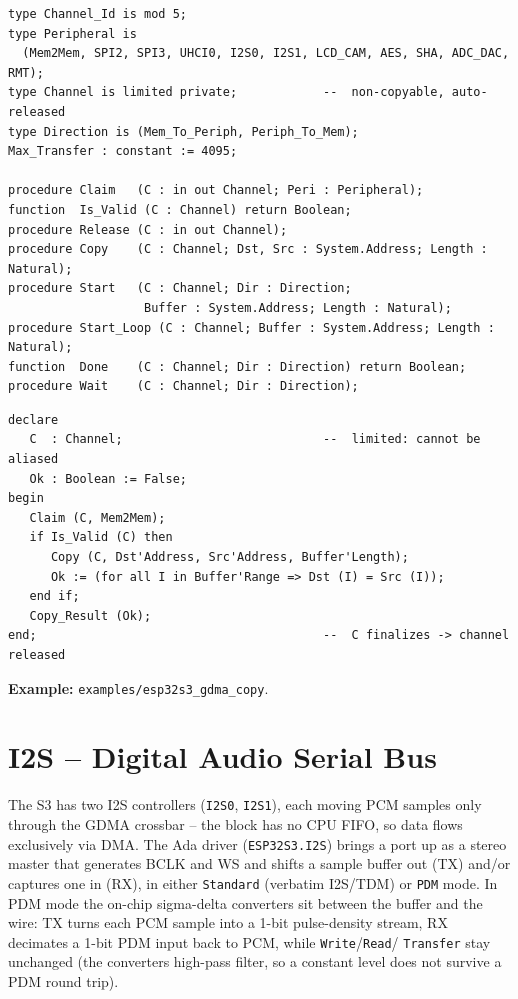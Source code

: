 \begin{lstlisting}
type Channel_Id is mod 5;
type Peripheral is
  (Mem2Mem, SPI2, SPI3, UHCI0, I2S0, I2S1, LCD_CAM, AES, SHA, ADC_DAC, RMT);
type Channel is limited private;            --  non-copyable, auto-released
type Direction is (Mem_To_Periph, Periph_To_Mem);
Max_Transfer : constant := 4095;

procedure Claim   (C : in out Channel; Peri : Peripheral);
function  Is_Valid (C : Channel) return Boolean;
procedure Release (C : in out Channel);
procedure Copy    (C : Channel; Dst, Src : System.Address; Length : Natural);
procedure Start   (C : Channel; Dir : Direction;
                   Buffer : System.Address; Length : Natural);
procedure Start_Loop (C : Channel; Buffer : System.Address; Length : Natural);
function  Done    (C : Channel; Dir : Direction) return Boolean;
procedure Wait    (C : Channel; Dir : Direction);
\end{lstlisting}

\begin{lstlisting}
declare
   C  : Channel;                            --  limited: cannot be aliased
   Ok : Boolean := False;
begin
   Claim (C, Mem2Mem);
   if Is_Valid (C) then
      Copy (C, Dst'Address, Src'Address, Buffer'Length);
      Ok := (for all I in Buffer'Range => Dst (I) = Src (I));
   end if;
   Copy_Result (Ok);
end;                                        --  C finalizes -> channel released
\end{lstlisting}


\noindent\textbf{Example:} \texttt{examples/esp32s3\_gdma\_copy}.

\section{I2S -- Digital Audio Serial Bus}
\label{app:int:i2s}

The S3 has two I2S controllers (\texttt{I2S0}, \texttt{I2S1}), each moving PCM
samples only through the GDMA crossbar -- the block has no CPU FIFO, so data
flows exclusively via DMA. The Ada driver (\texttt{ESP32S3.I2S}) brings a port up
as a stereo master that generates BCLK and WS and shifts a sample buffer out (TX)
and/or captures one in (RX), in either \texttt{Standard} (verbatim I2S/TDM) or
\texttt{PDM} mode. In PDM mode the on-chip sigma-delta converters sit between the
buffer and the wire: TX turns each PCM sample into a 1-bit pulse-density stream,
RX decimates a 1-bit PDM input back to PCM, while \texttt{Write}/\texttt{Read}/%
\texttt{Transfer} stay unchanged (the converters high-pass filter, so a constant
level does not survive a PDM round trip).

